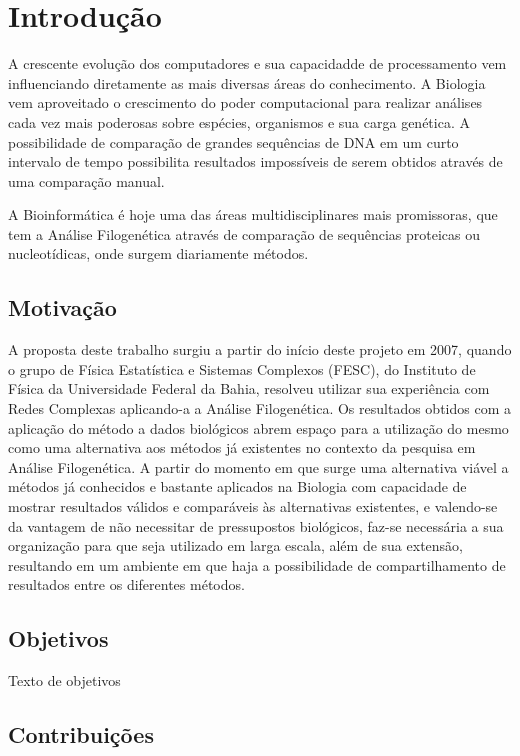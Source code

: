 \chapter{Introdução}

A crescente evolução dos computadores e sua capacidadde de processamento vem influenciando diretamente as mais diversas áreas do conhecimento. A Biologia
vem aproveitado o crescimento do poder computacional para realizar análises cada vez mais poderosas sobre espécies, organismos e sua carga genética.
A possibilidade de comparação de grandes sequências de DNA em um curto intervalo de tempo possibilita resultados impossíveis de serem obtidos através
de uma comparação manual.

A Bioinformática é hoje uma das áreas multidisciplinares mais promissoras, que tem a Análise Filogenética através de comparação de sequências proteicas ou
nucleotídicas, onde surgem diariamente métodos.

\section{Motivação}

A proposta deste trabalho surgiu a partir do início deste projeto em 2007, quando o grupo de Física Estatística e Sistemas Complexos (FESC),
do Instituto de Física da Universidade Federal da Bahia, resolveu utilizar sua experiência com Redes Complexas aplicando-a a Análise Filogenética.
Os resultados obtidos com a aplicação do método a dados biológicos abrem espaço para a utilização do mesmo como uma alternativa aos métodos
já existentes no contexto da pesquisa em Análise Filogenética. A partir do momento em que surge uma alternativa viável a métodos já conhecidos
e bastante aplicados na Biologia com capacidade de mostrar resultados válidos e comparáveis às alternativas existentes, e valendo-se da vantagem
de não necessitar de pressupostos biológicos, faz-se necessária a sua organização para que seja utilizado em larga escala, além de sua extensão,
resultando em um ambiente em que haja a possibilidade de compartilhamento de resultados entre os diferentes métodos.

\section{Objetivos} \label{sec:objetivos}

Texto de objetivos

\section{Contribuições}

